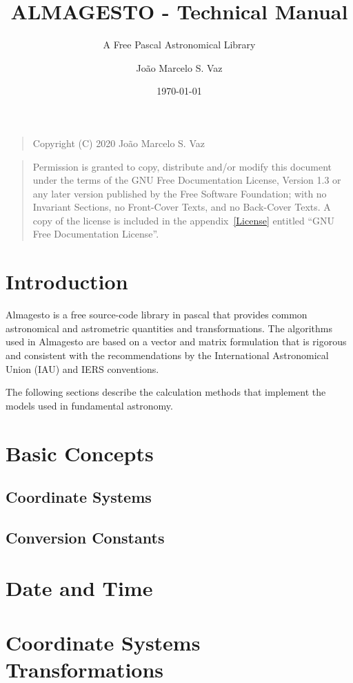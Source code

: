 \documentclass[a4paper,11pt]{scrreport}
\title{ALMAGESTO - Technical Manual}
\subtitle{A Free Pascal Astronomical Library}
\author{João Marcelo S. Vaz}
\date{\today}
\begin{document}
\maketitle
{}
\begin{quote}    
Copyright (C) 2020 João Marcelo S. Vaz
\end{quote}
\begin{quote} 
Permission is granted to copy, distribute and/or modify this document under the terms of the GNU Free Documentation License, Version 1.3 or any later version published by the Free Software Foundation; with no Invariant Sections, no Front-Cover Texts, and no Back-Cover Texts. A copy of the license is included in the appendix~\ref{License} entitled ``GNU Free Documentation License''.
\end{quote}
	
\tableofcontents

	
	
	
\clearpage
{}
\chapter{Introduction}

Almagesto is a free source-code library in pascal that provides common astronomical and astrometric quantities and transformations. The algorithms used in Almagesto are based on a vector and matrix formulation that is rigorous and consistent with the recommendations by the International Astronomical Union (IAU) and IERS conventions.

The following sections describe the calculation methods that implement the models used in fundamental astronomy.

\chapter{Basic Concepts}
\section{Coordinate Systems}
\section{Conversion Constants}

\chapter{Date and Time}
\chapter{Coordinate Systems Transformations}
\end{document}
